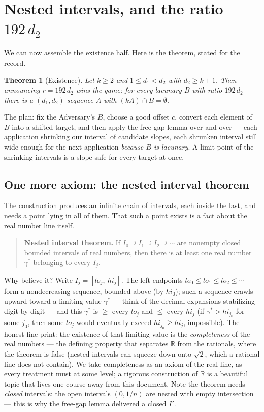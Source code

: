 \documentclass[11pt,reqno]{amsart}
\theoremstyle{plain}
\newtheorem{theorem}{Theorem}[section]
\theoremstyle{definition}
\theoremstyle{remark}
\newcommand{\RR}{\mathbb{R}}
\begin{document}
\section{Nested intervals, and the ratio \texorpdfstring{$192\,d_2$}{192 d2}}\label{sec:nested}

We can now assemble the existence half. Here is the theorem, stated for the record.

\begin{theorem}[Existence]\label{thm:existence-friendly}
Let $k \ge 2$ and $1 \le d_1 < d_2$ with $d_2 \ge k+1$. Then announcing
$r = 192\,d_2$ wins the game: for every lacunary $B$ with ratio $192\,d_2$ there is a
$(d_1,d_2)$-sequence $A$ with $(kA) \cap B = \emptyset$.
\end{theorem}

The plan: fix the Adversary's $B$, choose a good offset $c$, convert each element of
$B$ into a shifted target, and then apply the free-gap lemma over and over --- each
application shrinking our interval of candidate slopes, each shrunken interval still
wide enough for the next application \emph{because $B$ is lacunary}. A limit point of
the shrinking intervals is a slope safe for every target at once.

\subsection{One more axiom: the nested interval theorem}

The construction produces an infinite chain of intervals, each inside the last, and
needs a point lying in all of them. That such a point exists is a fact about the real
number line itself.

\begin{quote}
\textbf{Nested interval theorem.} If $I_0 \supseteq I_1 \supseteq I_2 \supseteq
\cdots$ are nonempty closed bounded intervals of real numbers, then there is at least
one real number $\gamma^*$ belonging to every $I_j$.
\end{quote}

Why believe it? Write $I_j = [lo_j,\ hi_j]$. The left endpoints $lo_0 \le lo_1 \le
lo_2 \le \cdots$ form a nondecreasing sequence, bounded above (by $hi_0$); such a
sequence crawls upward toward a limiting value $\gamma^*$ --- think of the
decimal expansions stabilizing digit by digit --- and this $\gamma^*$ is $\ge$ every
$lo_j$ and $\le$ every $hi_j$ (if $\gamma^* > hi_{j_0}$ for some $j_0$, then some
$lo_j$ would eventually exceed $hi_{j_0} \ge hi_j$, impossible). The honest fine
print: the existence of that limiting value is the \emph{completeness} of the real
numbers --- the defining property that separates $\RR$ from the rationals, where the
theorem is false (nested intervals can squeeze down onto $\sqrt2$, which a rational
line does not contain). We take completeness as an axiom of the real line, as every
treatment must at some level; a rigorous construction of $\RR$ is a beautiful topic
that lives one course away from this document. Note the theorem needs \emph{closed}
intervals: the open intervals $(0, 1/n)$ are nested with empty intersection ---
this is why the free-gap lemma delivered a closed $I'$.
\end{document}
